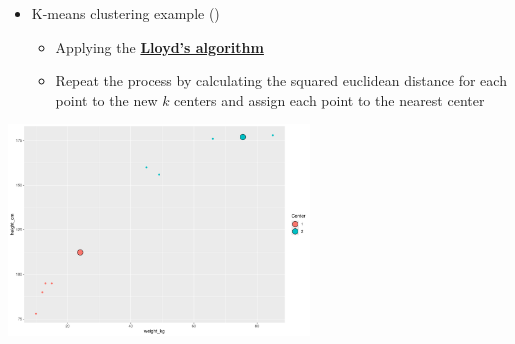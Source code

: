 \documentclass[
  ignorenonframetext,
]{beamer}
\begin{document}
\begin{frame}{}
\label{section-41}
\begin{itemize}
\item
  K-means clustering example
  ()

  \begin{itemize}
  \item
    Applying the
    \href{https://en.wikipedia.org/wiki/K-means_clustering}{\textbf{Lloyd's
    algorithm}}
  \item
    Repeat the process by calculating the squared euclidean distance for
    each point to the new \(k\) centers and assign each point to the
    nearest center
  \end{itemize}
\end{itemize}

\begin{center}
\includegraphics[width=0.6\textwidth,height=\textheight]{011_segmentation_clustering_files/figure-beamer/unnamed-chunk-29-1.pdf}
\end{center}
\end{frame}
\end{document}
